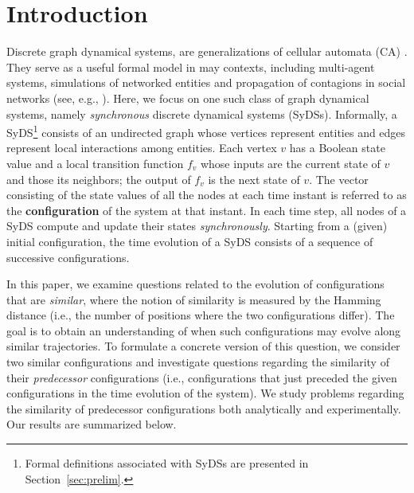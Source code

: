 \section{Introduction}
\label{sec:intro}

Discrete graph dynamical systems, are
generalizations of cellular automata (CA) \cite{Wol-1987,Gut-1989}.
They serve as a useful formal model in may 
contexts, including  multi-agent systems, 
simulations of networked entities and propagation
of contagions in social networks 
(see, e.g., \cite{Woo-2002,MR-2007,Valente-1996}).
Here, we focus on one such class of graph dynamical systems,
namely \emph{synchronous} discrete dynamical systems (SyDSs).
Informally,
a SyDS\footnote{Formal definitions associated with SyDSs are presented
in Section~\ref{sec:prelim}.}
 consists of an undirected graph whose vertices represent
entities and edges represent local interactions among entities.
Each vertex $v$ has a Boolean state value and
a local transition function $f_v$
whose inputs are the current state of $v$ and those its neighbors;
the output of $f_v$ is the next state of $v$.
The vector consisting of the state values of all the nodes at each time instant
is referred to as the \textbf{configuration} of the system at that instant.
In each time step, all nodes of a SyDS compute and update their
states \emph{synchronously}.
Starting from a (given) initial configuration,
the time evolution of a SyDS consists of a
sequence of successive configurations.

In this paper, we examine questions related to the evolution
of configurations that are \emph{similar}, where the notion of similarity
is measured by the Hamming distance (i.e., the number of positions
where the two configurations differ). 
The goal is to obtain an
understanding of when such configurations may evolve along 
similar trajectories.
To formulate a concrete version of this question, we consider
two similar configurations and
investigate questions regarding the similarity of 
their \emph{predecessor} configurations (i.e., configurations that
just preceded the given configurations in the time evolution of the system).
We study problems regarding the similarity of predecessor configurations
both analytically and experimentally. 
Our results are summarized below.

\smallskip


